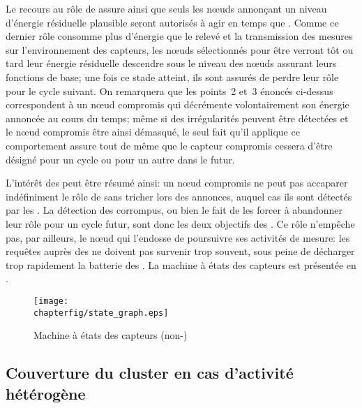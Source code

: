 Le recours au rôle de \vn assure ainsi que seuls les nœuds annonçant un niveau d'énergie résiduelle plausible seront autorisés à agir en temps que \cns.
Comme ce dernier rôle consomme plus d'énergie que le relevé et la transmission des mesures sur l'environnement des capteurs, les nœuds sélectionnés pour être \cns verront tôt ou tard leur énergie résiduelle descendre sous le niveau des nœuds assurant leurs fonctions de base; une fois ce stade atteint, ils sont assurés de perdre leur rôle pour le cycle suivant.
On remarquera que les points~2 et~3 énoncés ci-dessus correspondent à un nœud compromis qui décrémente volontairement son énergie annoncée au cours du temps; même si des irrégularités peuvent être détectées et le nœud compromis être ainsi démasqué, le seul fait qu'il applique ce comportement assure tout de même que le capteur compromis cessera d'être désigné \cn pour un cycle ou pour un autre dans le futur.

L'intérêt des \vns peut être résumé ainsi: un nœud compromis ne peut pas accaparer indéfiniment le rôle de \cn sans tricher lors des annonces, auquel cas ils sont détectés par les \vns.
La détection des \cns corrompus, ou bien le fait de les forcer à abandonner leur rôle pour un cycle futur, sont donc les deux objectifs des \vns.
Ce rôle n'empêche pas, par ailleurs, le nœud qui l'endosse de poursuivre ses activités de mesure: les requêtes auprès des \cns ne doivent pas survenir trop souvent, sous peine de décharger trop rapidement la batterie des \vns.
La machine à états des capteurs est présentée en .
\begin{figure}[ht]
    \centering
    \texttt{[image: \\chapterfig/state\_graph.eps]}
    \caption{Machine à états des capteurs (non-\cn)}\label{se:fig:states}
\end{figure}

    \subsection{Couverture du cluster en cas d'activité hétérogène}

